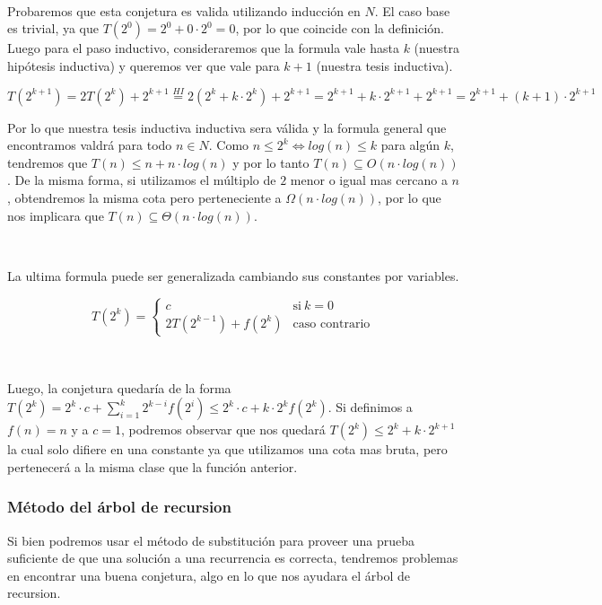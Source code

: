 ~

Probaremos que esta conjetura es valida utilizando inducci\'on en $N$. El caso base es trivial, ya que $T(2^0) = 2^0 + 0 \cdot 2^0 = 0$, por lo que coincide con la definici\'on. Luego para el paso inductivo, consideraremos que la formula vale hasta $k$ (nuestra hip\'otesis inductiva) y queremos ver que vale para $k+1$ (nuestra tesis inductiva).

\begin{equation*}
 T(2^{k+1}) = 2T(2^k) + 2^{k+1} \overset{HI}{=} 2(2^k + k \cdot 2^k) + 2^{k+1} = 2^{k+1} + k \cdot 2^{k+1} + 2^{k+1} = 2^{k+1} + (k+1) \cdot 2^{k+1}
\end{equation*}

Por lo que nuestra tesis inductiva inductiva sera v\'alida y la formula general que encontramos valdr\'a para todo $n \in N$. Como $n \leq 2^k \iff log(n) \leq k$ para alg\'un $k$, tendremos que $T(n) \leq n + n \cdot log(n)$ y por lo tanto $T(n) \subseteq O(n \cdot log(n))$. De la misma forma, si utilizamos el m\'ultiplo de $2$ menor o igual mas cercano a $n$, obtendremos la misma cota pero perteneciente a $\Omega(n \cdot log(n))$, por lo que nos implicara que $T(n) \subseteq \Theta(n \cdot log(n))$.

~

La ultima formula puede ser generalizada cambiando sus constantes por variables.

\begin{equation*}
  T(2^k) = \begin{cases}
	      c         		& \text{si} \ k = 0 \\
	      2T(2^{k-1}) + f(2^k)        	& \text{caso contrario}
	  \end{cases}
\end{equation*}

~

Luego, la conjetura quedar\'ia de la forma $T(2^k) = 2^k \cdot c + \sum_{i=1}^k 2^{k-i} f(2^i) \leq 2^k \cdot c + k \cdot 2^k f(2^k)$. Si definimos a $f(n) = n$ y a $c=1$, podremos observar que nos quedar\'a $T(2^k) \leq 2^k + k \cdot 2^{k+1}$ la cual solo difiere en una constante ya que utilizamos una cota mas bruta, pero pertenecer\'a a la misma clase que la funci\'on anterior.

\subsubsection{M\'etodo del \'arbol de recursion}

Si bien podremos usar el m\'etodo de substituci\'on para proveer una prueba suficiente de que una soluci\'on a una recurrencia es correcta, tendremos problemas en encontrar una buena conjetura, algo en lo que nos ayudara el \'arbol de recursion.

